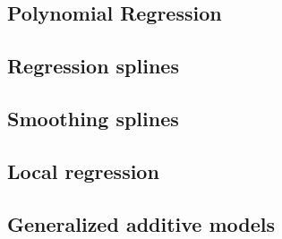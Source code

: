 \subsection{Polynomial Regression}

%
\subsection{Regression splines}

\subsection{Smoothing splines}

\subsection{Local regression}

\subsection{Generalized additive models}

%
%
